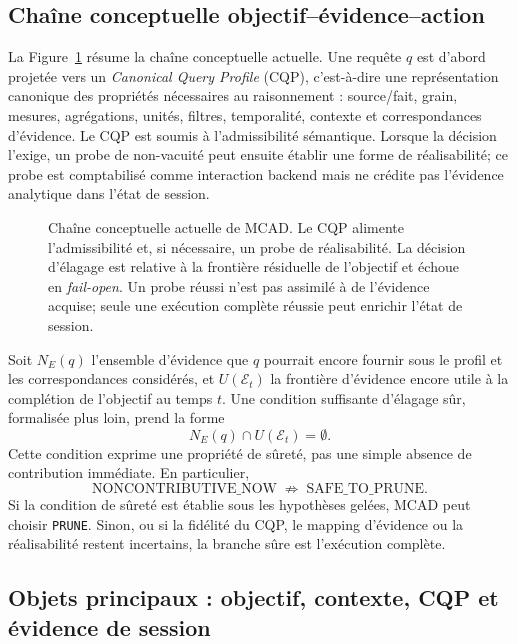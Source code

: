 \documentclass[journal]{IEEEtran}
\begin{document}
\subsection{Chaîne conceptuelle objectif--évidence--action}

La Figure~\ref{fig:concept-chain} résume la chaîne conceptuelle actuelle. Une requête $q$ est d'abord projetée vers un \emph{Canonical Query Profile} (CQP), c'est-à-dire une représentation canonique des propriétés nécessaires au raisonnement : source/fait, grain, mesures, agrégations, unités, filtres, temporalité, contexte et correspondances d'évidence. Le CQP est soumis à l'admissibilité sémantique. Lorsque la décision l'exige, un probe de non-vacuité peut ensuite établir une forme de réalisabilité; ce probe est comptabilisé comme interaction backend mais ne crédite pas l'évidence analytique dans l'état de session.

\begin{figure}[!t]
\centering
\resizebox{\textwidth}{!}{}
\caption{Chaîne conceptuelle actuelle de MCAD. Le CQP alimente l'admissibilité et, si nécessaire, un probe de réalisabilité. La décision d'élagage est relative à la frontière résiduelle de l'objectif et échoue en \emph{fail-open}. Un probe réussi n'est pas assimilé à de l'évidence acquise; seule une exécution complète réussie peut enrichir l'état de session.}
\label{fig:concept-chain}
\end{figure}

Soit $N_E(q)$ l'ensemble d'évidence que $q$ pourrait encore fournir sous le profil et les correspondances considérés, et $U(\mathcal{E}_t)$ la frontière d'évidence encore utile à la complétion de l'objectif au temps $t$. Une condition suffisante d'élagage sûr, formalisée plus loin, prend la forme
\[
N_E(q)\cap U(\mathcal{E}_t)=\emptyset.
\]
Cette condition exprime une propriété de sûreté, pas une simple absence de contribution immédiate. En particulier,
\[
\text{NONCONTRIBUTIVE\_NOW}\;\not\Rightarrow\;\text{SAFE\_TO\_PRUNE}.
\]
Si la condition de sûreté est établie sous les hypothèses gelées, MCAD peut choisir \texttt{PRUNE}. Sinon, ou si la fidélité du CQP, le mapping d'évidence ou la réalisabilité restent incertains, la branche sûre est l'exécution complète.

\subsection{Objets principaux : objectif, contexte, CQP et évidence de session}
\end{document}
